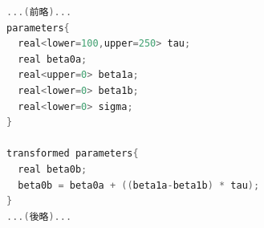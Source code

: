 \begin{lstlisting}[language=C++,label={stan::28_04},caption={折線回帰のモデルコード2}]
...(前略)...
parameters{
  real<lower=100,upper=250> tau;
  real beta0a;
  real<upper=0> beta1a;
  real<lower=0> beta1b;
  real<lower=0> sigma;
}

transformed parameters{
  real beta0b;
  beta0b = beta0a + ((beta1a-beta1b) * tau);
}
...(後略)...
\end{lstlisting}
